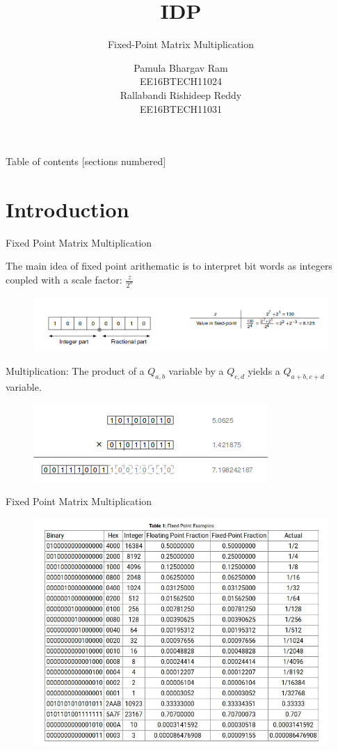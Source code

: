 \documentclass[10pt]{beamer}
\title{IDP}
\subtitle{Fixed-Point Matrix Multiplication}
\date{}
\author{Pamula Bhargav Ram\\EE16BTECH11024\\Rallabandi Rishideep Reddy\\EE16BTECH11031}
\institute{Problem statement and Implementation Strategy}
\begin{document}
\maketitle

\begin{frame}{Table of contents}
  [sections numbered]
  \tableofcontents[hideallsubsections]
\end{frame}

\section{Introduction}

\begin{frame}[fragile]{Fixed Point Matrix Multiplication}

  The main idea of fixed point arithematic is to interpret bit words as integers coupled with a scale factor: \( \displaystyle \frac{z}{2^n} \)
  \begin{figure}
    \includegraphics[scale=0.6]{Fixed.png}
  \end{figure}
  Multiplication: The product of a \(Q_{a,b}\) variable by a \(Q_{c,d}\) yields a \(Q_{a+b,c+d}\) variable.
  \begin{figure}
    {\includegraphics[scale=0.5]{MULTI.png}}
  \end{figure}
\end{frame}
\begin{frame}{Fixed Point Matrix Multiplication}
  \begin{figure}
    \includegraphics[scale=0.45]{Fixed_point.jpg}
  \end{figure}
\end{frame}
\end{document}
